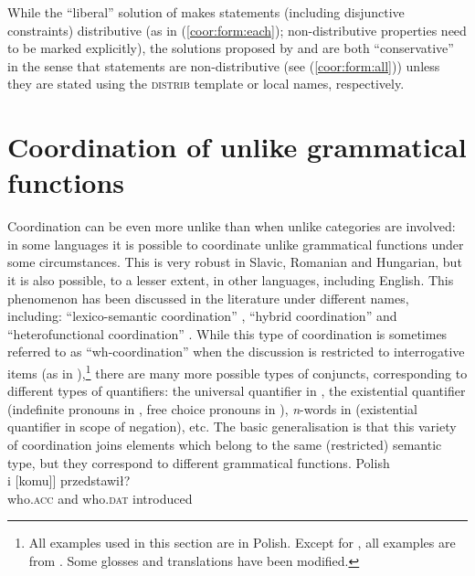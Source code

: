 \documentclass[output=paper]{../langscibook}
\begin{document}
While the ``liberal'' solution of \citet{przepiorkowski-patejuk2012}
makes statements (including disjunctive constraints) distributive (as
in (\ref{coor:form:each}); non-distributive properties
need to be marked explicitly), the solutions proposed by
\citet{kapl:17} and \citet{PP2021} are both
``conservative'' in the sense that statements are non-distribu\-tive
(see (\ref{coor:form:all})) unless they are stated
using the \textsc{distrib} template or local names, respectively.


\section{Coordination of unlike grammatical functions}
\label{sec:Coordination:lexsem}

Coordination can be even more unlike than when
unlike categories are involved: in some languages it is possible to
coordinate unlike grammatical functions under some circumstances.
This is very robust in Slavic, Romanian and Hungarian, but
it is also possible, to a lesser extent, in other languages, including
English.
%
This phenomenon has been discussed in the literature under
different names, including: ``lexico-semantic coordination'' \citep{sann:79,sann:80,Melcuk1988},
``hybrid coordination'' \citep{cha:pap:07} and ``heterofunctional
coordination'' \citep{prze:22:salt}. While this type of coordination is sometimes referred to as
``wh-coordination'' \citep{bil:gaz:12} when the discussion is restricted to interrogative items
(as in ),\footnote{All examples used in this
  section are in Polish. Except for ,
  all examples are from \citet{Patejuk2015}. Some glosses and
  translations have been modified.} there are many more possible
types of conjuncts, corresponding to different types of quantifiers: the
universal quantifier in , the
existential quantifier (indefinite pronouns in
, free choice pronouns in
), \emph{n}-words in
 (existential quantifier in
scope of negation), etc. The basic generalisation is that
this variety of coordination joins elements which belong to the same (restricted)
semantic type, but they correspond to different grammatical functions.
\ea\label{ex:241:FROM:kall:93}
    Polish\\\gll
      [[Kogo] i [komu]] przedstawił? \\
      \phtm{[[}who.\textsc{acc} and \phtm{[}who.\textsc{dat} introduced\\
\end{document}
